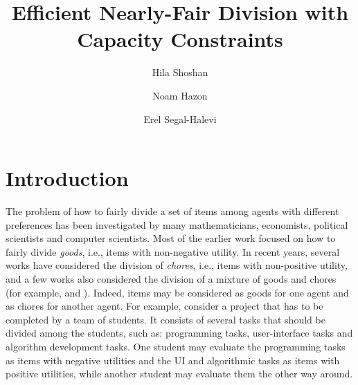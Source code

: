 \documentclass[sigconf]{aamas}
\title{Efficient Nearly-Fair Division with Capacity Constraints}
\author{Hila Shoshan}
\affiliation{
  \institution{Ariel University}
  \city{Ariel}
  \country{Israel}}
\author{Noam Hazon}
\affiliation{
  \institution{Ariel University}
  \city{Ariel}
  \country{Israel}}
\author{Erel Segal-Halevi}
\affiliation{
  \institution{Ariel University}
  \city{Ariel}
  \country{Israel}}
\theoremstyle{definition}
\newcommand{\hi}[1]{\textcolor{Pink}{#1}}
\begin{document}

\pagestyle{fancy}
\fancyhead{}


\maketitle 



\section{Introduction}
The problem of how to fairly divide a set of items among agents with different preferences has been investigated by many mathematicians, economists, political scientists and computer scientists.
Most of the earlier work focused on how to fairly divide \emph{goods}, i.e., items with non-negative utility. 
In recent years, several works have considered the division of \emph{chores}, i.e., items with non-positive utility, and a few works also considered the division of a mixture of goods and chores (for example, \citet{aziz2022fair} and \citet{Brczi2020}).
Indeed, items may be  considered as goods for one agent and as chores for another agent. For example, consider a project that has to be completed by a team of students. It consists of several tasks that should be divided among the students, such as: programming tasks, user-interface tasks and algorithm development tasks. One student may evaluate the programming tasks as items with negative utilities and the UI and algorithmic tasks as items with positive utilities, while another student may evaluate them the other way around. 
\end{document}
